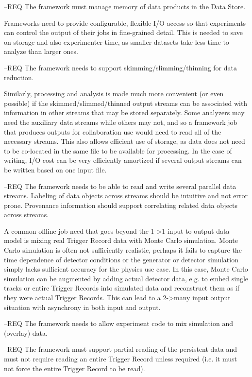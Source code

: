 \documentclass[../main-v1.tex]{subfiles}
\begin{document}
--REQ The framework must manage memory of data products in the Data Store.

Frameworks need to provide configurable, flexible I/O access so that experiments can control the output of their jobs in fine-grained detail.  This is needed to save on storage and also experimenter time, as smaller datasets take less time to analyze than larger ones.
 
--REQ The framework needs to support skimming/slimming/thinning for data reduction.

Similarly, processing and analysis is made much more convenient (or even possible) if the skimmed/slimmed/thinned output streams can be associated with information in other streams that may be stored separately.  Some analyzers may need the auxiliary data streams while others may not, and so a framework job that produces outputs for collaboration use would need to read all of the necessary streams.  This also allows efficient use of storage, as data does not need to be co-located in the same file to be available for processing.  In the case of writing, I/O cost can be very efficiently amortized if several output streams can be written based on one input file.

--REQ The framework needs to be able to read and write several parallel data streams.  Labeling of data objects across streams should be intuitive and not error prone.  Provenance information should support correlating related data objects across streams.

A common offline job need that goes beyond the 1->1 input to output data model is mixing real Trigger Record data with Monte Carlo simulation.  Monte Carlo simulation is often not sufficiently realistic, perhaps it fails to capture the time dependence of detector conditions or the generator or detector simulation simply lacks sufficient accuracy for the physics use case.  In this case, Monte Carlo simulation can be augmented by adding actual detector data, e.g. to embed single tracks or entire Trigger Records into simulated data and reconstruct them as if they were actual Trigger Records.  This can lead to a 2->many input output situation with asynchrony in both input and output. 

--REQ The framework needs to allow experiment code to mix simulation and (overlay) data.


--REQ The framework must support partial reading of the persistent data and must not require reading an entire Trigger Record unless required (i.e. it must not force the entire Trigger Record to be read).
\end{document}
